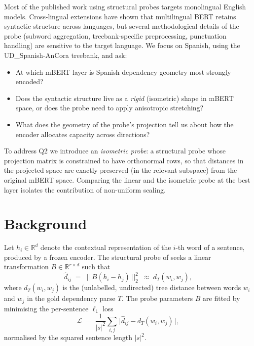 \documentclass[11pt,a4paper]{article}
\newcommand{\ancora}{UD\_Spanish-AnCora\xspace}
\begin{document}
Most of the published work using structural probes targets monolingual
English models. Cross-lingual extensions \citep{chi2020finding} have
shown that multilingual BERT \citep{pires2019multilingual} retains
syntactic structure across languages, but several methodological
details of the probe (subword aggregation, treebank-specific
preprocessing, punctuation handling) are sensitive to the target
language. We focus on Spanish, using the \ancora treebank, and ask:
\begin{itemize}
  \item[\textbf{Q1}] At which mBERT layer is Spanish dependency
        geometry most strongly encoded?
  \item[\textbf{Q2}] Does the syntactic structure live as a
        \emph{rigid} (isometric) shape in mBERT space, or does the
        probe need to apply anisotropic stretching?
  \item[\textbf{Q3}] What does the geometry of the probe's projection
        tell us about how the encoder allocates capacity across
        directions?
\end{itemize}

To address Q2 we introduce an \emph{isometric probe}: a structural
probe whose projection matrix is constrained to have orthonormal
rows, so that distances in the projected space are exactly preserved
(in the relevant subspace) from the original mBERT space. Comparing
the linear and the isometric probe at the best layer isolates the
contribution of non-uniform scaling.

\section{Background}
\label{sec:background}

Let $h_i \in \mathbb{R}^d$ denote the contextual representation of the
$i$-th word of a sentence, produced by a frozen encoder. The structural
probe of \citet{hewitt2019structural} seeks a linear transformation
$B \in \mathbb{R}^{r \times d}$ such that
\begin{equation}
  \widehat{d}_{ij} \;=\; \lVert B(h_i - h_j) \rVert_2^2
  \;\approx\; d_T(w_i, w_j),
  \label{eq:probe}
\end{equation}
where $d_T(w_i, w_j)$ is the (unlabelled, undirected) tree distance
between words $w_i$ and $w_j$ in the gold dependency parse $T$. The
probe parameters $B$ are fitted by minimising the per-sentence
$\ell_1$ loss
\begin{equation}
  \mathcal{L} \;=\; \frac{1}{|s|^2}
    \sum_{i,j} \bigl|\, \widehat{d}_{ij} - d_T(w_i, w_j) \,\bigr|,
  \label{eq:loss}
\end{equation}
normalised by the squared sentence length $|s|^2$.
\end{document}
